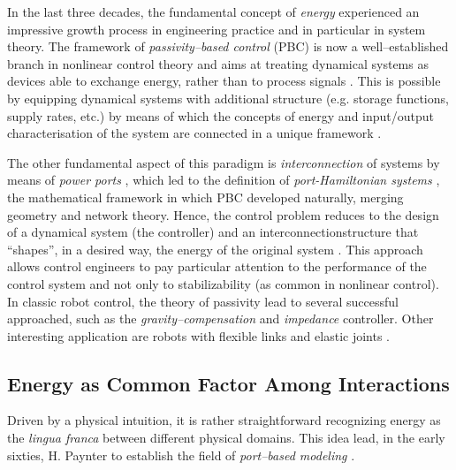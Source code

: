 %
In the last three decades, the fundamental concept of \textit{energy} experienced an impressive growth process in engineering practice and in particular in system theory. 
%
%
%
The framework of \textit{passivity--based control} (PBC) is now a well--established branch in nonlinear control theory and aims at treating dynamical systems as devices able to exchange energy, rather than to process signals \cite{ortega2001putting}. 
This is possible by equipping dynamical systems with additional structure (e.g. storage functions, supply rates, etc.) by means of which the concepts of energy and input/output characterisation of the system are connected in a unique framework \cite{sontag2008input}.
%
\newline

%
The other fundamental aspect of this paradigm is \textit{interconnection} of systems by means of \textit{power ports} \cite{duindam2009modeling}, which led to the definition of \textit{port-Hamiltonian systems} \cite{van2014port,ortega2001putting,MASCHKE1992359}, the mathematical framework in which PBC developed naturally, merging geometry and network theory. Hence, the control problem reduces to the design of a dynamical system (the controller) and an interconnectionstructure that ``shapes'', in a desired way, the energy of the original system \cite{ortega2001putting,ortega2008control}.
%
%
%
This approach allows control engineers to pay particular attention to the performance of the control system and not only to stabilizability (as common in nonlinear control).
%
%
%
In classic robot control, the theory of passivity lead to several successful approached, such as the \textit{gravity--compensation} \cite{arimoto1984stability} and \textit{impedance} controller. Other interesting application are robots with flexible links \cite{macchelli2009} and elastic joints \cite{zhang2016}.
%
\subsection{Energy as Common Factor Among Interactions}\label{subsec:comm_fact}
%
Driven by a physical intuition, it is rather straightforward recognizing energy as the \textit{lingua franca} between different physical domains. This idea lead, in the early sixties, H. Paynter to establish the field of \textit{port--based modeling} \cite{paynter1961analysis}.
%
\newline

